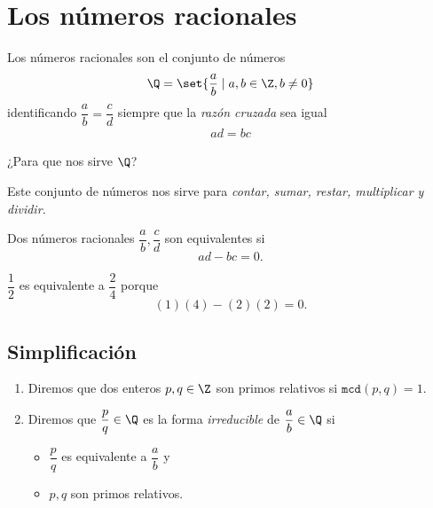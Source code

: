 
\section{Los números racionales}


	Los números racionales son el conjunto de números
	$$
	\Q=\set{\frac{a}{b} \mid a,b \in \Z, b\neq 0} 
	$$
identificando $\dfrac{a}{b}=\dfrac{c}{d}$ siempre que la \emph{razón cruzada} sea igual
\begin{align*}
ad=bc
\end{align*}




	¿Para que nos sirve $\Q$? 
	
	Este conjunto de números nos sirve para \emph{contar, sumar, restar, multiplicar y dividir.}



	\begin{definicion}
		\label{rat:equiv}
		Dos números racionales $\dfrac{a}{b},\dfrac{c}{d}$ son equivalentes si
		$$
		ad-bc=0.
		$$
	\end{definicion}

{}

	\begin{problema}
		$\dfrac{1}{2}$ es equivalente a $\dfrac{2}{4}$ porque
		$$
		\left( 1 \right)\left( 4 \right)-\left( 2 \right)\left( 2 \right)=0.
		$$
	\end{problema}
	


\subsection{Simplificaci\'on}

 
	\begin{definicion}
		\begin{enumerate}
			\item Diremos que dos enteros $p,q\in \Z$ son primos relativos si $\texttt{mcd}(p,q)=1.$ 
			\item Diremos que $\dfrac{p}{q}\in \Q$ es la forma \emph{irreducible} de $\dfrac{a}{b}\in \Q$ si 
			\begin{itemize}
				\item $\dfrac{p}{q}$ es equivalente a $\dfrac{a}{b}$ y
				\item $p,q$ son primos relativos.
			\end{itemize}
			
		\end{enumerate}
		
	\end{definicion}
	




